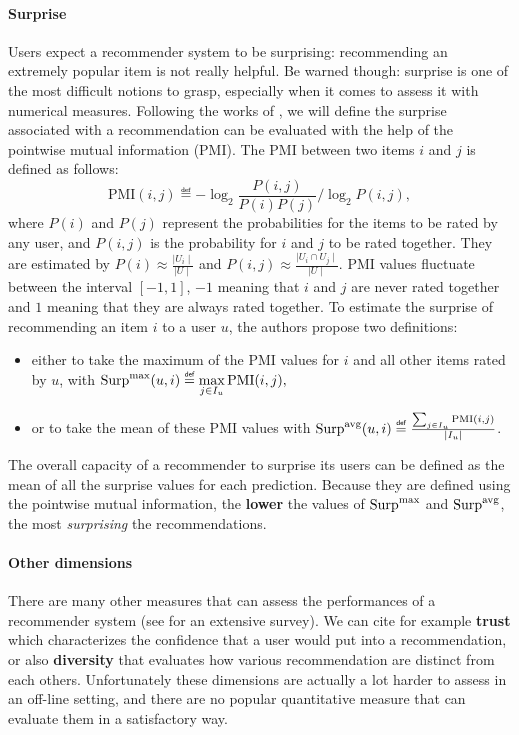 \paragraph{Surprise\\}
Users expect a recommender system to be surprising: recommending an extremely
popular item is not really helpful. Be warned though: surprise is one of the
most difficult notions to grasp, especially when it comes to assess it with
numerical measures. Following the works of \cite{KamBriRecSys2014}, we will
define the surprise associated with a recommendation can be evaluated with the
help of the pointwise mutual information (PMI). The PMI between two items $i$
and $j$ is defined as follows:
$$\text{PMI}(i, j) \eqdef -\log_2 \frac{P(i, j)}{P(i)P(j)} / \log_2 P(i, j),$$
where $P(i)$ and $P(j)$  represent the probabilities for the items to be rated
by any user, and $P(i, j)$ is the probability for $i$ and $j$ to be rated
together. They are estimated by $P(i) \approx \frac{\mid U_i \mid}{\mid U
\mid}$ and $P(i, j) \approx \frac{\mid U_i \cap U_j \mid}{\mid U\mid}$. PMI
values fluctuate between the interval $[-1, 1]$, $-1$ meaning that $i$ and $j$
are never rated together and $1$ meaning that they are always rated together.
To estimate the surprise of recommending an item $i$ to a user $u$, the authors
propose two definitions:
\begin{itemize}
\item either to take the maximum of the PMI values for $i$ and all other items
  rated by $u$, with $\surpmax(u, i) \eqdef \max\limits_{j\in I_u}
    \text{PMI}(i, j),$
\item
 or to take the mean of these PMI values with $\surpavg(u, i) \eqdef
    \frac{\sum_{j \in I_u} \text{PMI}(i, j)}{\mid I_u\mid }$.
\end{itemize}

The overall capacity of a recommender to surprise its users can be defined as
the mean of all the surprise values for each prediction. Because they are
defined using the pointwise mutual information, the \textbf{lower} the values
of $\text{Surp}^{\text{max}}$ and $\text{Surp}^{\text{avg}}$, the most \textit{surprising} the recommendations.


\paragraph{Other dimensions\\}

There are  many other measures that can assess the performances of a
recommender system (see \cite{ShaGun11} for an extensive survey). We can cite
for example \textbf{trust} which characterizes the confidence that a user would
put into a recommendation, or also \textbf{diversity} that evaluates how
various recommendation are distinct from each others.  Unfortunately these
dimensions are actually a lot harder to assess in an off-line setting, and
there are no popular quantitative measure that can evaluate them in a
satisfactory way.

